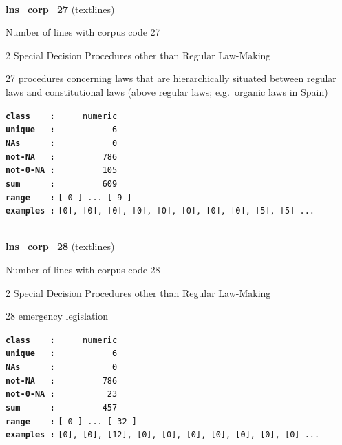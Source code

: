 \documentclass[]{article}
\begin{document}
~

\textbf{lns\_corp\_27} (textlines)

Number of lines with corpus code 27

2 Special Decision Procedures other than Regular Law-Making

27 procedures concerning laws that are hierarchically situated between
regular laws and constitutional laws (above regular laws; e.g.~organic
laws in Spain)

\textbf{\texttt{class\ \ \ \ :}} \texttt{~~~~~numeric}\\
\textbf{\texttt{unique\ \ \ :}} \texttt{~~~~~~~~~~~6}\\
\textbf{\texttt{NAs\ \ \ \ \ \ :}} \texttt{~~~~~~~~~~~0}\\
\textbf{\texttt{not-NA\ \ \ :}} \texttt{~~~~~~~~~786}\\
\textbf{\texttt{not-0-NA\ :}} \texttt{~~~~~~~~~105}\\
\textbf{\texttt{sum\ \ \ \ \ \ :}} \texttt{~~~~~~~~~609}\\
\textbf{\texttt{range\ \ \ \ :}}
\texttt{{[}\ 0\ {]}\ ...\ {[}\ 9\ {]}}\\
\textbf{\texttt{examples\ :}}
\texttt{{[}0{]},\ {[}0{]},\ {[}0{]},\ {[}0{]},\ {[}0{]},\ {[}0{]},\ {[}0{]},\ {[}0{]},\ {[}5{]},\ {[}5{]}\ ...}\\

~

\textbf{lns\_corp\_28} (textlines)

Number of lines with corpus code 28

2 Special Decision Procedures other than Regular Law-Making

28 emergency legislation

\textbf{\texttt{class\ \ \ \ :}} \texttt{~~~~~numeric}\\
\textbf{\texttt{unique\ \ \ :}} \texttt{~~~~~~~~~~~6}\\
\textbf{\texttt{NAs\ \ \ \ \ \ :}} \texttt{~~~~~~~~~~~0}\\
\textbf{\texttt{not-NA\ \ \ :}} \texttt{~~~~~~~~~786}\\
\textbf{\texttt{not-0-NA\ :}} \texttt{~~~~~~~~~~23}\\
\textbf{\texttt{sum\ \ \ \ \ \ :}} \texttt{~~~~~~~~~457}\\
\textbf{\texttt{range\ \ \ \ :}}
\texttt{{[}\ 0\ {]}\ ...\ {[}\ 32\ {]}}\\
\textbf{\texttt{examples\ :}}
\texttt{{[}0{]},\ {[}0{]},\ {[}12{]},\ {[}0{]},\ {[}0{]},\ {[}0{]},\ {[}0{]},\ {[}0{]},\ {[}0{]},\ {[}0{]}\ ...}\\
\end{document}
